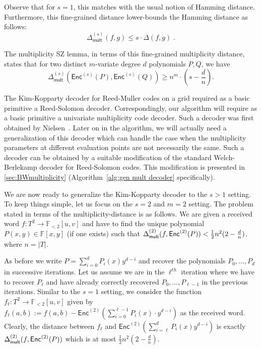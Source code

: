 \documentclass{article}
\def\Field{\mathbb{F}}
\let\F\Field
\newcommand{\enc}{{\mathsf{Enc}}}
\begin{document}
	Observe that for $s=1$, this matches with the usual notion of Hamming
	distance. Furthermore, this fine-grained distance lower-bounds the
	Hamming distance as follows:
	\[ \Delta_{\mathsf{mult}}^{(s)}(f,g) \leq s \cdot \Delta(f,g)
	\;. \]
	
	The multiplicity SZ lemma, in terms of this fine-grained
	multiplicity distance, states that for two distinct $m$-variate degree $d$
	polynomials $P,Q$, we have
	\[\Delta_{\mathsf{mult}}^{(s)} (\enc^{(s)}(P),\enc^{(s)}(Q))\geq n^{m} \cdot \left(s - \frac{d}{n}\right).\]
	
	The Kim-Kopparty decoder for Reed-Muller codes on a grid required as a basic
	primitive a Reed-Solomon decoder. Correspondingly, our algorithm will
	require as a basic primitive a univariate multiplicity code
	decoder. Such a decoder was first obtained by
	Nielsen~\cite{Nielsen2001}. Later on in the algorithm, we will
	actually need a  generalization of this decoder which can
	handle the case when the multiplicity parameters at different
	evaluation points are not necessarily the same.  Such a decoder can be obtained by a
	suitable modification of the standard Welch-Berlekamp decoder for
	Reed-Solomon codes. This modification is presented in
	\cref{sec:BWmultiplicity} (Algorithm~\ref{alg:gen mult decoder} specifically). 
	
	We are now ready to generalize the Kim-Kopparty decoder to the $s>1$
	setting. To keep things simple, let us focus on the $s=2$ and $m=2$
	setting. The problem stated in terms of the multiplicity-distance is
	as follows. We are given a received word
	$f\colon T^2 \to \F_{<2}[u,v]$ and have to find the unique polynomial
	$P(x, y) \in \mathbb{F}[x, y]$ (if one exists) such that
	$\Delta_{\sf{mult}}^{(2)}(f,\enc^{(2)}(P)) < \frac{1}{2} n^2
	(2-\frac{d}{n})$, where $n=|T|$.
	
	
	As before we write $P= \sum_{i=0}^d P_i(x) y^{d-i}$ and recover the
	polynomials $P_0,\ldots, P_d$ in successive iterations. Let us assume
	we are in the $\ell^{th}$ iteration where we have to recover $P_\ell$ and
	have already correctly recovered $P_0,\ldots, P_{\ell-1}$ in the previous
	iterations. Similar to the $s=1$ setting, we consider the function $f_{\ell}\colon T^2 \to \F_{<2}[u,v]$
	given by
	$f_{\ell}(a,b) := f(a,b) - \enc^{(2)}\left(\sum_{i = 0}^{\ell-1}P_i(x)\cdot y^{d-i}\right)$ as
	the received word. Clearly, the distance between $f_{\ell}$
	and $\enc^{(2)}\left(\sum_{i = \ell}^d P_i(x)y^{d-i}\right)$ is exactly
	$\Delta_{\sf{mult}}^{(2)}(f,\enc^{(2)}(P))$ which is at most $\frac{1}{2}
	n^2 (2-\frac{d}{n})$.  
	
\end{document}
